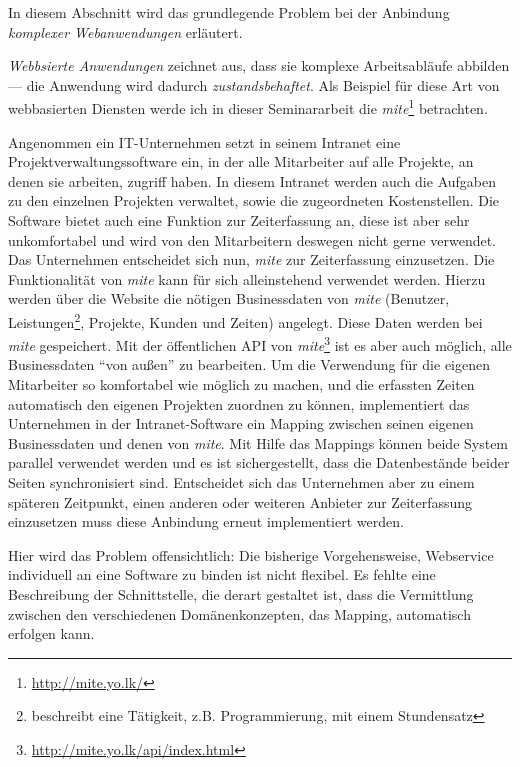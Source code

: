 In diesem Abschnitt wird das grundlegende Problem bei der Anbindung \emph{komplexer Webanwendungen} erläutert.

\bigskip

\emph{Webbsierte Anwendungen} zeichnet aus, dass sie komplexe Arbeitsabläufe abbilden --- die Anwendung wird dadurch \emph{zustandsbehaftet}. Als Beispiel für diese Art von webbasierten Diensten werde ich in dieser Seminararbeit die \emph{mite}\footnote{\url{http://mite.yo.lk/}} betrachten. 

Angenommen ein IT-Unternehmen setzt in seinem Intranet eine Projektverwaltungssoftware ein, in der alle Mitarbeiter auf alle Projekte, an denen sie arbeiten, zugriff haben. In diesem Intranet werden auch die Aufgaben zu den einzelnen Projekten verwaltet, sowie die zugeordneten Kostenstellen. Die Software bietet auch eine Funktion zur Zeiterfassung an, diese ist aber sehr unkomfortabel und wird von den Mitarbeitern deswegen nicht gerne verwendet. Das Unternehmen entscheidet sich nun, \emph{mite} zur Zeiterfassung einzusetzen. Die Funktionalität von \emph{mite} kann für sich alleinstehend verwendet werden. Hierzu werden über die Website die nötigen Businessdaten von \emph{mite} (Benutzer, Leistungen\footnote{beschreibt eine Tätigkeit, z.B. Programmierung, mit einem Stundensatz}, Projekte, Kunden und Zeiten) angelegt. Diese Daten werden bei \emph{mite} gespeichert. Mit der öffentlichen \ac{API} von \emph{mite}\footnote{\url{http://mite.yo.lk/api/index.html}} ist es aber auch möglich, alle Businessdaten "`von außen"' zu bearbeiten. Um die Verwendung für die eigenen Mitarbeiter so komfortabel wie möglich zu machen, und die erfassten Zeiten automatisch den eigenen Projekten zuordnen zu können, implementiert das Unternehmen in der Intranet-Software ein Mapping zwischen seinen eigenen Businessdaten und denen von \emph{mite}. Mit Hilfe das Mappings können beide System parallel verwendet werden und es ist sichergestellt, dass die Datenbestände beider Seiten synchronisiert sind. Entscheidet sich das Unternehmen aber zu einem späteren Zeitpunkt, einen anderen oder weiteren Anbieter zur Zeiterfassung einzusetzen muss diese Anbindung erneut implementiert werden.

Hier wird das Problem offensichtlich: Die bisherige Vorgehensweise, Webservice individuell an eine Software zu binden ist nicht flexibel. Es fehlte eine Beschreibung der Schnittstelle, die derart gestaltet ist, dass die Vermittlung zwischen den verschiedenen Domänenkonzepten, das Mapping, automatisch erfolgen kann.

